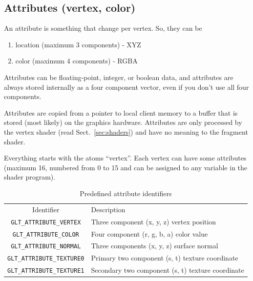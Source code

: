 \subsection{Attributes (vertex, color)}
\label{sec:attributes}

An attribute is something that change per vertex. So, they can be
\begin{enumerate}
\item location (maximum 3 components) - XYZ
\item color (maximum 4 components) - RGBA
\end{enumerate}
Attributes can be floating-point, integer, or boolean data, and
attributes are always stored internally as a four component vector,
even if you don't use all four components.



\begin{framed}
  Attributes are copied from a pointer to local client memory to a
  buffer that is stored (most likely) on the graphics
  hardware. Attributes are only processed by the vertex shader (read
  Sect.~\ref{sec:shaders}) and have no meaning to the fragment shader.
\end{framed}

Everything starts with the atoms ``vertex''. Each vertex can have some
attributes (maximum 16, numbered from 0 to 15 and can be assigned to
any variable in the shader program). 

\begin{table}[hbt]
  \begin{center}
    \caption{Predefined attribute identifiers}
    \begin{tabular}{cp{8cm}} 
      \hline
      Identifier & Description \\
      \verb!GLT_ATTRIBUTE_VERTEX! & Three component (x, y, z) vertex position\\
      \verb!GLT_ATTRIBUTE_COLOR! & Four component (r, g, b, a) color value\\
      \verb!GLT_ATTRIBUTE_NORMAL! & Three components (x, y, z) surface
      normal \\
      \verb!GLT_ATTRIBUTE_TEXTURE0! & Primary two component (s, t) texture
      coordinate \\
      \verb!GLT_ATTRIBUTE_TEXTURE1! & Secondary two component (s, t) texture
      coordinate \\
      \hline\hline
    \end{tabular}
  \end{center}
  \label{tab:attribute_id}
\end{table}

